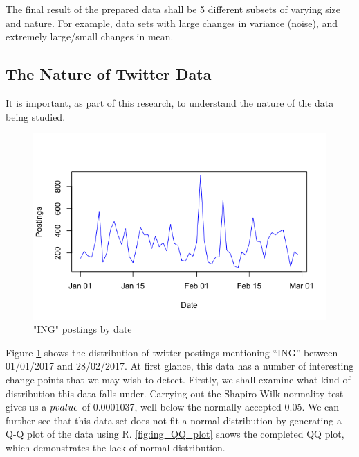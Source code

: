\documentclass{uvamscse}	%
\begin{document}

The final result of the prepared data shall be 5 different subsets of varying size and nature. For example, data sets with large changes in variance (noise), and extremely large/small changes in mean.

\subsection{The Nature of Twitter Data}

It is important, as part of this research, to understand the nature of the data being studied.

\begin{figure}[t]
	\includegraphics[scale=0.5]{figures/ing-totals-full.png}
	\centering
	\caption{"ING" postings by date}
	\label{fig:ing_totals_graph}
\end{figure}

Figure \ref{fig:ing_totals_graph} shows the distribution of twitter postings mentioning ``ING'' between 01/01/2017 and 28/02/2017. At first glance, this data has a number of interesting change points that we may wish to detect. Firstly, we shall examine what kind of distribution this data falls under. Carrying out the Shapiro-Wilk normality test gives us a $p\-value$ of 0.0001037, well below the normally accepted 0.05. We can further see that this data set does not fit a normal distribution by generating a Q-Q plot of the data using R. \ref{fig:ing_QQ_plot} shows the completed QQ plot, which demonstrates the lack of normal distribution.
\end{document}
